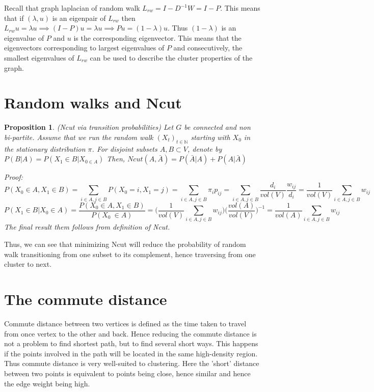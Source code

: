 \documentclass[10pt,a4paper, nocenter]{report}
\newtheorem{prop}{Proposition}
\begin{document}
	Recall that graph laplacian of random walk $L_{rw} = I-D^{-1}W = I-P$. This means that if $(\lambda, u)$ is an eigenpair of $L_{rw}$ then $L_{rw}u=\lambda u \implies (I-P)u = \lambda u \implies Pu = (1-\lambda)u$. Thus $(1-\lambda)$ is an eigenvalue of $P$ and $u$ is the corresponding eigenvector. This means that the eigenvectors corresponding to largest eigenvalues of $P$ and consecutively, the smallest eigenvalues of $L_{rw}$ can be used to describe the cluster properties of the graph. 
	
	\section{Random walks and Ncut}
	\begin{prop} (Ncut via transition probabilities) Let $G$ be connected and non bi-partite. Assume that we run the random walk $(X_{t})_{t\in\mathbb{N}}$ starting with $X_{0}$ in the stationary distribution $\pi$. For disjoint subsets $A,B \subset V$, denote by $P(B\lvert A) = P(X_{1} \in B \lvert X_{0 \in A})$ Then, $Ncut(A,\bar{A}) = P(\bar{A}\lvert A) + P(A\lvert \bar{A})$ 
	
	\textit{Proof:} $$P(X_{0}\in A, X_{1}\in B) = \sum_{i\in A, j\in B}	P(X_{0} = i, X_{1} = j) = \sum_{i\in A, j\in B}\pi_{i}p_{ij} = \sum_{i\in A, j\in B}\frac{d_{i}}{vol(V)}\frac{w_{ij}}{d_{i}} = \frac{1}{vol(V)} \sum_{i\in A, j\in B}w_{ij}$$
	$$ P(X_{1} \in B \lvert X_{0}\in A) = \frac{P(X_{0}\in A, X_{1}\in B)}{P(X_{0} \ \in A)} = \bigg( \frac{1}{vol(V)}\sum_{i\in A, j\in B}w_{ij}\bigg)\bigg(\frac{vol(A)}{vol(V)}\bigg)^{-1} = \frac{1}{vol(A)}\sum_{i\in A, j\in B}w_{ij}$$
	The final result them follows from definition of Ncut. 
	\end{prop}

	Thus, we can see that minimizing Ncut will reduce the probability of random walk transitioning from one subset to its complement, hence traversing from one cluster to next. 

	\section{The commute distance}
	Commute distance between two vertices is defined as the time taken to travel from once vertex to the other and back. Hence reducing the commute distance is not a problem to find shortest path, but to find several short ways. This happens if the points involved in the path will be located in the same high-density region. Thus commute distance is very well-suited to clustering. Here the 'short' distance between two points is equivalent to points being close, hence similar and hence the edge weight being high. 
	
\end{document}

